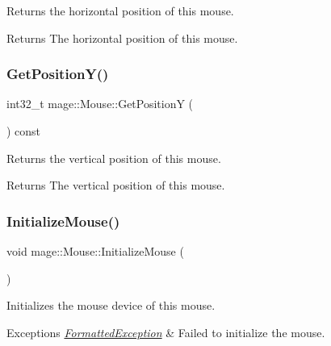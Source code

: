 Returns the horizontal position of this mouse.

\begin{DoxyReturn}{Returns}
The horizontal position of this mouse. 
\end{DoxyReturn}
\hypertarget{classmage_1_1_mouse_a1b0929c31a0422e4bfa79ec84ed4a735}{}\label{classmage_1_1_mouse_a1b0929c31a0422e4bfa79ec84ed4a735} 
\subsubsection{\texorpdfstring{Get\+Position\+Y()}{GetPositionY()}}
{\footnotesize\ttfamily int32\+\_\+t mage\+::\+Mouse\+::\+Get\+PositionY (\begin{DoxyParamCaption}{ }\end{DoxyParamCaption}) const\hspace{0.3cm}{\ttfamily [noexcept]}}

Returns the vertical position of this mouse.

\begin{DoxyReturn}{Returns}
The vertical position of this mouse. 
\end{DoxyReturn}
\hypertarget{classmage_1_1_mouse_ac158b6d6fff5b05dea5ebefa86c0d56a}{}\label{classmage_1_1_mouse_ac158b6d6fff5b05dea5ebefa86c0d56a} 
\subsubsection{\texorpdfstring{Initialize\+Mouse()}{InitializeMouse()}}
{\footnotesize\ttfamily void mage\+::\+Mouse\+::\+Initialize\+Mouse (\begin{DoxyParamCaption}{ }\end{DoxyParamCaption})\hspace{0.3cm}{\ttfamily [private]}}

Initializes the mouse device of this mouse.


\begin{DoxyExceptions}{Exceptions}
{\em \hyperlink{structmage_1_1_formatted_exception}{Formatted\+Exception}} & Failed to initialize the mouse. \\
\hline
\end{DoxyExceptions}
\hypertarget{classmage_1_1_mouse_a585119f1b0db3fbc7436c86676518c8c}{}\label{classmage_1_1_mouse_a585119f1b0db3fbc7436c86676518c8c} 
